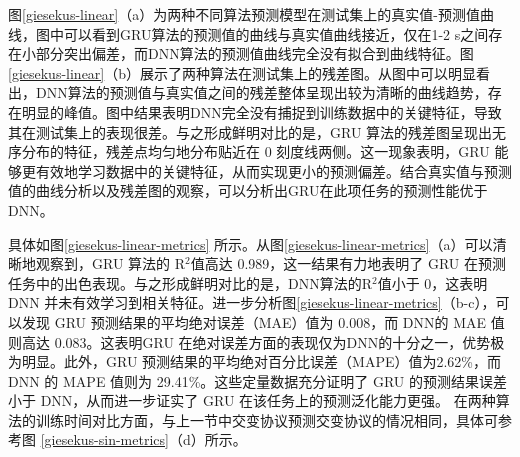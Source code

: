图\ref{giesekus-linear}（a）为两种不同算法预测模型在测试集上的真实值-预测值曲线，图中可以看到GRU算法的预测值的曲线与真实值曲线接近，仅在1-2 s之间存在小部分突出偏差，而DNN算法的预测值曲线完全没有拟合到曲线特征。图\ref{giesekus-linear}（b）展示了两种算法在测试集上的残差图。从图中可以明显看出，DNN算法的预测值与真实值之间的残差整体呈现出较为清晰的曲线趋势，存在明显的峰值。图中结果表明DNN完全没有捕捉到训练数据中的关键特征，导致其在测试集上的表现很差。与之形成鲜明对比的是，GRU 算法的残差图呈现出无序分布的特征，残差点均匀地分布贴近在 0 刻度线两侧。这一现象表明，GRU 能够更有效地学习数据中的关键特征，从而实现更小的预测偏差。结合真实值与预测值的曲线分析以及残差图的观察，可以分析出GRU在此项任务的预测性能优于DNN。


具体如图\ref{giesekus-linear-metrics} 所示。从图\ref{giesekus-linear-metrics}（a）可以清晰地观察到，GRU 算法的 R$^2$值高达 0.989，这一结果有力地表明了 GRU 在预测任务中的出色表现。与之形成鲜明对比的是，DNN算法的R$^2$值小于 0，这表明 DNN 并未有效学习到相关特征。进一步分析图\ref{giesekus-linear-metrics}（b-c），可以发现 GRU 预测结果的平均绝对误差（MAE）值为 0.008，而 DNN的 MAE 值则高达 0.083。这表明GRU 在绝对误差方面的表现仅为DNN的十分之一，优势极为明显。此外，GRU 预测结果的平均绝对百分比误差（MAPE）值为2.62\%，而DNN 的 MAPE 值则为 29.41\%。这些定量数据充分证明了 GRU 的预测结果误差小于 DNN，从而进一步证实了 GRU 在该任务上的预测泛化能力更强。
在两种算法的训练时间对比方面，与上一节中交变协议预测交变协议的情况相同，具体可参考图 \ref{giesekus-sin-metrics}（d）所示。

